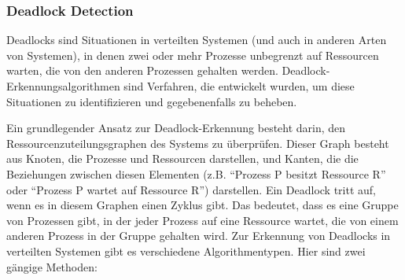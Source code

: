 \subsubsection{Deadlock Detection}

Deadlocks sind Situationen in verteilten Systemen (und auch in anderen Arten von Systemen), in denen zwei oder mehr Prozesse unbegrenzt auf Ressourcen warten, die von den anderen Prozessen gehalten werden. Deadlock-Erkennungsalgorithmen sind Verfahren, die entwickelt wurden, um diese Situationen zu identifizieren und gegebenenfalls zu beheben.

Ein grundlegender Ansatz zur Deadlock-Erkennung besteht darin, den Ressourcenzuteilungsgraphen des Systems zu überprüfen. Dieser Graph besteht aus Knoten, die Prozesse und Ressourcen darstellen, und Kanten, die die Beziehungen zwischen diesen Elementen (z.B. \enquote{Prozess P besitzt Ressource R} oder \enquote{Prozess P wartet auf Ressource R}) 
darstellen. Ein Deadlock tritt auf, wenn es in diesem Graphen einen Zyklus gibt. Das bedeutet, dass es eine Gruppe von Prozessen gibt, in der jeder Prozess auf eine Ressource wartet, die von einem anderen Prozess in der Gruppe gehalten wird.
Zur Erkennung von Deadlocks in verteilten Systemen gibt es verschiedene Algorithmentypen. Hier sind zwei gängige Methoden:

